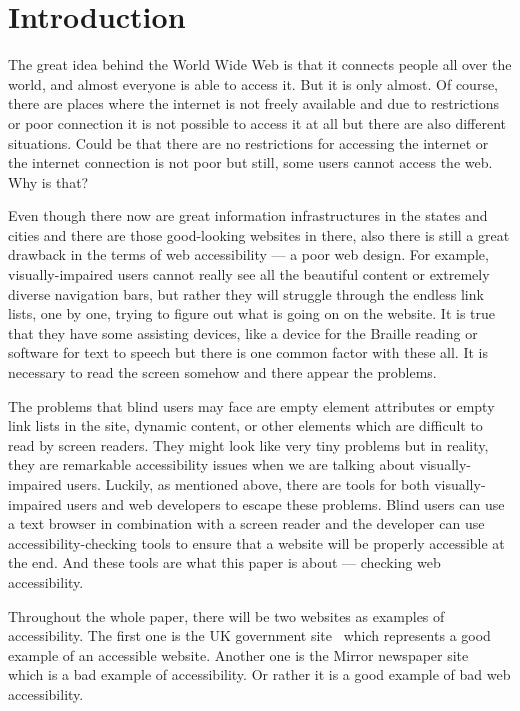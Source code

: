 %
%
% 
% 


\chapter{Introduction}

The great idea behind the World Wide Web is that it connects people
all over the world, and almost everyone is able to access it. But it
is only almost. Of course, there are places where the internet is not
freely available and due to restrictions or poor connection it is not
possible to access it at all but there are also different
situations. Could be that there are no restrictions for accessing the
internet or the internet connection is not poor but still, some users
cannot access the web. Why is that?

Even though there now are great information infrastructures in the
states and cities and there are those good-looking websites in there,
also there is still a great drawback in the terms of web accessibility
--- a poor web design. For example, visually-impaired users cannot really
see all the beautiful content or extremely diverse navigation bars,
but rather they will struggle through the endless link lists, one by
one, trying to figure out what is going on on the website. It is true
that they have some assisting devices, like a device for the Braille
reading or software for text to speech but there is one common factor
with these all. It is necessary to read the screen somehow and there
appear the problems.

The problems that blind users may face are empty element attributes or
empty link lists in the site, dynamic content, or other elements which
are difficult to read by screen readers. They might look like very
tiny problems but in reality, they are remarkable accessibility issues
when we are talking about visually-impaired users. Luckily, as
mentioned above, there are tools for both visually-impaired users and
web developers to escape these problems. Blind users can use a text
browser in combination with a screen reader and the developer can use
accessibility-checking tools to ensure that a website will be properly
accessible at the end. And these tools are what this paper is about ---
checking web accessibility.

Throughout the whole paper, there will be two websites as examples of
accessibility. The first one is the UK government site~\parencite{GovUK}
which represents a good example of an accessible website. Another one is 
the Mirror newspaper site~\parencite{MirrorUK}
which is a bad example of accessibility. Or rather it is
a good example of bad web accessibility.


